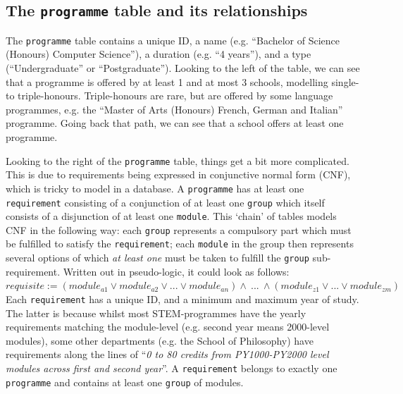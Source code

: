     \subsection{The \texttt{programme} table and its relationships}
    The \texttt{programme} table contains a unique ID, a name (e.g. ``Bachelor
    of Science (Honours) Computer Science''), a duration (e.g. ``4 years''), and
    a type (``Undergraduate'' or ``Postgraduate''). Looking to the left of the
    table, we can see that a programme is offered by at least 1 and at most 3
    schools, modelling single- to triple-honours. Triple-honours are rare, but
    are offered by some language programmes, e.g. the ``Master of Arts (Honours)
    French, German and Italian'' programme. Going back that path, we can see
    that a school offers at least one programme.
    
    Looking to the right of the \texttt{programme} table, things get a bit more
    complicated. This is due to requirements being expressed in conjunctive
    normal form (CNF), which is tricky to model in a database. A 
    \texttt{programme} has at least one \texttt{requirement} consisting of a
    conjunction of at least one \texttt{group} which itself consists of a
    disjunction of at least one \texttt{module}. This `chain' of tables models
    CNF in the following way: each \texttt{group} represents a compulsory part
    which must be fulfilled to satisfy the \texttt{requirement}; each
    \texttt{module} in the group then represents several options of which
    \textit{at least one} must be taken to fulfill the \texttt{group}
    sub-requirement. Written out in pseudo-logic, it could look as follows:\\
    \begin{math}
        requisite := (module_{a1} \lor module_{a2} \lor ... \lor module_{an})
        \land\ ...\ \land (module_{z1} \lor ... \lor module_{zm})
    \end{math}
    \\
    
    Each \texttt{requirement} has a unique ID, and a minimum and maximum year of
    study. The latter is because whilst most STEM-programmes have the yearly
    requirements matching the module-level (e.g. second year means 2000-level
    modules), some other departments (e.g. the School of Philosophy) have
    requirements along the lines of ``\textit{0 to 80 credits from PY1000-PY2000
    level modules across first and second year}''. A \texttt{requirement}
    belongs to exactly one \texttt{programme} and contains at least one
    \texttt{group} of modules.
    
